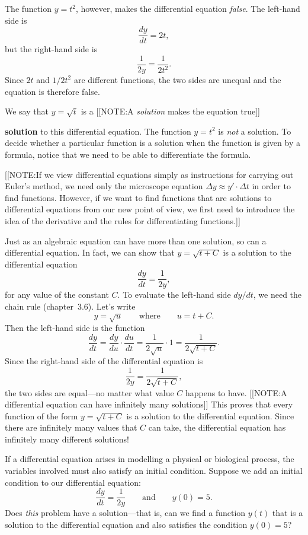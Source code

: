 	The function $y = t^2$, however, makes the differential equation {\em false}.  The left-hand side is
	\[
\dfrac{dy}{dt} = 2t,
\]
but the right-hand side is
	\[
\dfrac{1}{2y} = \dfrac{1}{2t^2}.
\]
Since $2t$ and $1/2t^2$ are different functions, the two sides are unequal and the equation is therefore false.  

	We say that $y = \sqrt{t}$ is a 
	[[NOTE:A {\em solution\/} makes  the equation true]]

{\bf solution} to this differential equation.  The function $y = t^2$ is {\em not\/} a solution.  To decide whether a particular function is a solution when the function is given by a formula, notice that we need to be able to differentiate the formula.  

[[NOTE:If we view differential equations simply as instructions for carrying out Euler's method, we need only the microscope equation $\Delta y \approx y'\cdot \Delta t$ in order to find functions.  However, if we want to find functions that are solutions to differential equations from our new point of view, we first need to introduce the idea of the derivative and the rules for differentiating functions.]]

	Just as an algebraic equation can have more than one solution, so can a differential equation.  In fact, we can show that $y = \sqrt{t + C}$ is a solution to the differential equation 
	\[
\dfrac{dy}{dt} = \dfrac{1}{2y},
\]
for any value of the constant $C$.  To evaluate the left-hand side $dy/dt$, we need the chain rule (chapter~3.6).  Let's write
	\[
y = \sqrt{u} \qquad \mbox{where} \qquad u = t + C.
\]
Then the left-hand side is the function
	\[
\dfrac{dy}{dt} = \dfrac{dy}{du} \cdot \dfrac{du}{dt} =
	\dfrac{1}{2\sqrt{u}} \cdot 1 = \dfrac{1}{2\sqrt{t + C}}.
\]
Since the right-hand side of the differential equation is
	\[
\dfrac{1}{2y} = \dfrac{1}{2 \sqrt{t + C}},
\]
the two sides are equal---no matter what value $C$ happens to have.  
	[[NOTE:A differential equation can have infinitely many solutions]]
This proves that every function of the form $y = \sqrt{t + C}$ is a solution to the differential equation.  Since there are infinitely many values that $C$ can take, the differential equation has infinitely many different solutions!  


	If a differential equation arises in modelling a physical or biological process, the variables involved must also satisfy an initial condition.  Suppose we add an initial condition to our differential equation:
	\[
\dfrac{dy}{dt} = \dfrac{1}{2y} \qquad \mbox{and}
		\qquad y(0) = 5.
\]
Does {\em this\/} problem have a solution---that is, can we find a function $y(t)$ that is a solution to the differential equation and also satisfies the condition $y(0) = 5$?  

